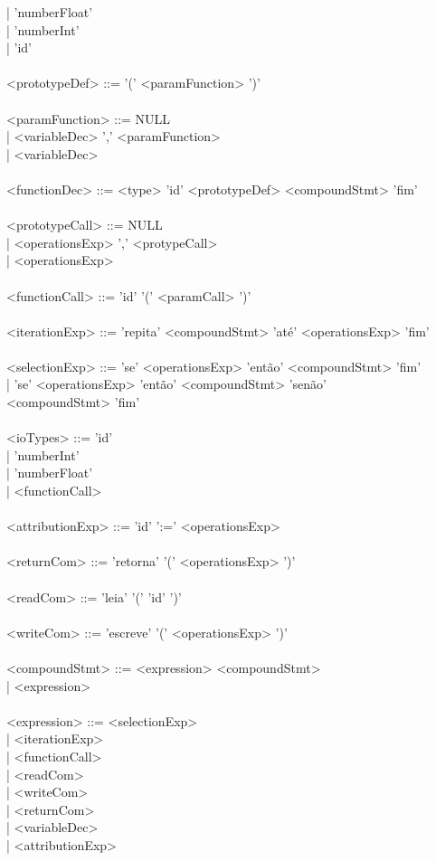\documentclass[12pt,a4paper,final]{article}
\newcommand\tab[1][1cm]{\hspace*{#1}}
\begin{document}
\tab \tab | 'numberFloat'\\
\tab \tab | 'numberInt'\\
\tab \tab | 'id'\\
\\
<prototypeDef> ::= '(' <paramFunction> ')'\\
\\
<paramFunction> ::= NULL\\
\tab \tab \tab | <variableDec> ',' <paramFunction>\\
\tab \tab \tab | <variableDec>\\
\\
<functionDec> ::= <type> 'id' <prototypeDef> <compoundStmt> 'fim'\\
\\
<prototypeCall> ::= NULL\\
\tab \tab \tab | <operationsExp> ',' <protypeCall>\\
\tab \tab \tab | <operationsExp>\\
\\
<functionCall> ::= 'id' '(' <paramCall> ')' \\
\\
<iterationExp> ::= 'repita' <compoundStmt> 'até' <operationsExp> 'fim'\\
\\
<selectionExp> ::= 'se' <operationsExp> 'então' <compoundStmt> 'fim'\\
\tab \tab \tab | 'se' <operationsExp> 'então' <compoundStmt> 'senão'\\ <compoundStmt> 'fim'\\
\\
<ioTypes> ::= 'id'\\
\tab \tab | 'numberInt'\\
\tab \tab | 'numberFloat'\\
\tab \tab | <functionCall>\\
\\
<attributionExp> ::= 'id' ':=' <operationsExp>\\
\\
<returnCom> ::= 'retorna' '(' <operationsExp> ')'\\
\\
<readCom> ::= 'leia' '(' 'id' ')'\\
\\
<writeCom> ::= 'escreve' '(' <operationsExp> ')'\\
\\
<compoundStmt> ::= <expression> <compoundStmt>\\
\tab \tab \tab \tab | <expression>\\
\\
<expression> ::= <selectionExp>\\
\tab \tab \tab | <iterationExp>\\
\tab \tab \tab | <functionCall>\\
\tab \tab \tab | <readCom>\\
\tab \tab \tab | <writeCom>\\
\tab \tab \tab | <returnCom>\\
\tab \tab \tab | <variableDec>\\
\tab \tab \tab | <attributionExp>\\
\end{document}
